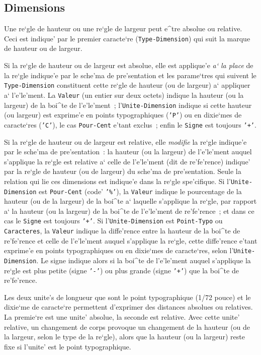 \subsection{Dimensions}

Une re`gle de hauteur ou une re`gle de largeur peut e^tre absolue ou
relative. Ceci est indique' par le premier caracte`re ({\tt Type-Dimension})
qui suit la marque de hauteur ou de largeur.

Si la re`gle de hauteur ou de largeur est absolue, elle est applique'e
{\em a` la place} de la re`gle indique'e par le sche'ma de pre'sentation et les
parame`tres qui suivent le {\tt Type-Dimension} constituent cette re`gle de
hauteur (ou de largeur) a` appliquer a` l'e'le'ment. La {\tt Valeur}
(un entier sur deux octets) indique la hauteur (ou la largeur) de la boi^te
de l'e'le'ment~; l'{\tt Unite-Dimension} indique si cette hauteur (ou
largeur) est exprime'e en points typographiques ({\tt 'P'}) ou en dixie`mes
de caracte`res ({\tt 'C'}), le cas {\tt Pour-Cent} e'tant exclus~; enfin le
{\tt Signe} est toujours {\tt '+'}.

Si la re`gle de hauteur ou de largeur est relative, elle {\em modifie}
la re`gle indique'e par le sche'ma de pre'sentation~: la hauteur (ou la largeur)
de l'e'le'ment auquel s'applique la re`gle est relative a` celle de l'e'le'ment
(dit de re'fe'rence) indique' par la re`gle de hauteur (ou de largeur) du
sche'ma de pre'sentation.
Seule la relation qui lie ces dimensions est indique'e dans la re`gle
spe'cifique. Si l'{\tt Unite-Dimension} est {\tt Pour-Cent} (code' {\tt '\%'}),
la {\tt Valeur} indique le pourcentage de la hauteur (ou de la largeur)
de la boi^te a` laquelle s'applique la re`gle, par rapport a` la hauteur (ou la largeur) de la boi^te de l'e'le'ment de re'fe'rence~; et dans ce cas le
{\tt Signe} est toujours {\tt '+'}. Si l'{\tt Unite-Dimension} est
{\tt Point-Typo} ou {\tt Caracteres}, la {\tt Valeur} indique la diffe'rence
entre la hauteur de la boi^te de re'fe'rence et celle de l'e'le'ment auquel
s'applique la re`gle, cette diffe'rence e'tant exprime'e en points
typographiques ou en dixie`mes de caracte`res, selon l'{\tt Unite-Dimension}.
Le signe indique alors si la boi^te de l'e'le'ment auquel s'applique la
re`gle est plus petite (signe {\tt '-'}) ou plus grande (signe {\tt '+'})
que la boi^te de re'fe'rence.

Les deux unite's de longueur que sont le point typographique (1/72 pouce) et
le dixie`me de caracte`re permettent d'exprimer des distances absolues ou
relatives. La premie`re est une unite' absolue, la seconde est relative.
Avec cette unite' relative, un changement de corps provoque un
changement de la hauteur (ou de la largeur, selon le type de la re`gle),
alors que la hauteur (ou la largeur) reste fixe si l'unite' est le point
typographique.

